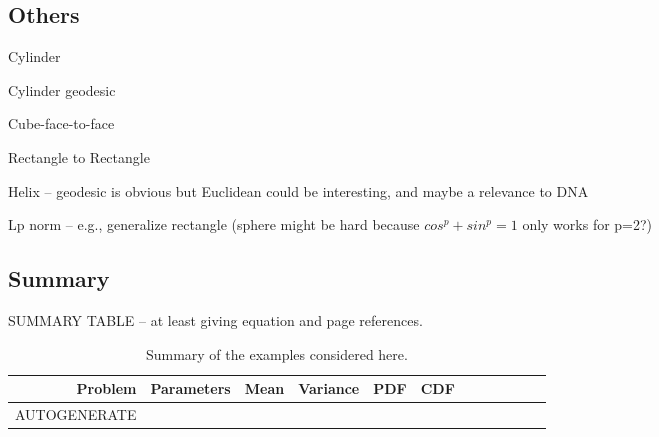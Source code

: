 \documentclass{article}
\begin{document}
\clearpage


\clearpage


\clearpage


\clearpage


\clearpage


\clearpage


\clearpage


\clearpage

\clearpage



\clearpage


\clearpage


\clearpage


\clearpage


\clearpage
\subsection{Others}

Cylinder

Cylinder geodesic

Cube-face-to-face

Rectangle to Rectangle

Helix -- geodesic is obvious but Euclidean could be interesting, and
maybe a relevance to DNA
 

Lp norm -- e.g., generalize rectangle (sphere might be hard because
$cos^p+sin^p=1$ only works for p=2?)



\clearpage
\subsection{Summary}
SUMMARY TABLE -- at least giving equation and page references.

\begin{table}[ht]
  \centering
  \begin{tabular}{r|lllllllllll}
    Problem & Parameters & Mean & Variance & PDF & CDF \\
    \hline
    AUTOGENERATE
  \end{tabular}
  \caption{Summary of the examples considered here.}
  \label{tab:summary}
\end{table}

\clearpage


\clearpage

\end{document}
